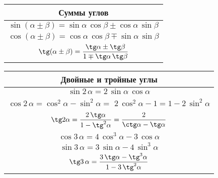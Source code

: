 \begin{tabu}[t]{||c||}
	\hline
		\textbf{Суммы углов} \\
	\hline
	\hline
		$\displaystyle \sin(\alpha\pm \beta) = \sin \alpha\, \cos \beta \pm \cos \alpha\, \sin \beta $ \\
	\hline
		$\displaystyle \cos(\alpha\pm \beta) = \cos \alpha\, \cos \beta \mp \sin \alpha\, \sin \beta $ \\
	\hline
		$\displaystyle \tg (\alpha \pm \beta) = \frac{\tg \alpha \pm \tg \beta}{1 \mp \tg \alpha \, \tg \beta} $ \\
	\hline
\end{tabu}

\begin{tabu}[t]{||c||}
	\hline
		\textbf{Двойные и тройные углы} \\
	\hline
	\hline
		$ \sin 2\, \alpha = 2\, \sin \alpha\, \cos \alpha $ \\
	\hline
		 \\
	\hline
		$\displaystyle \tg 2\alpha = \frac{2\, \tg \alpha}{1 - \tg^2 \alpha} = \frac{2}{\ctg \alpha - \tg \alpha} $ \\
	\hline
		$\displaystyle \cos 3\, \alpha = 4\, \cos^3 \alpha - 3\, \cos \alpha $ \\
	\hline
		$\displaystyle \sin 3\, \alpha = 3\, \sin \alpha - 4\, \sin^3 \alpha $ \\
	\hline
		$\displaystyle \tg 3\, \alpha = \frac{3\, \tg \alpha - \tg^3 \alpha}{1 - 3\, \tg^2 \alpha} $ \\
	\hline
\end{tabu}

